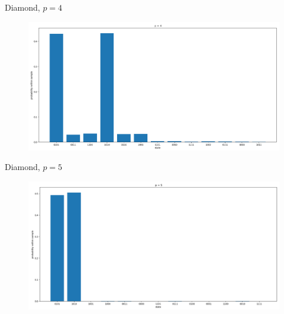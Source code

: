 \documentclass{beamer}
\begin{document}
\begin{frame}{Diamond, $p = 4$}
\begin{figure}
	\centering
	\includegraphics[scale=0.3,left]{figures/diamond-p4.png}
\end{figure}
\end{frame}

\begin{frame}{Diamond, $p = 5$}
\begin{figure}
	\centering
	\includegraphics[scale=0.3,left]{figures/diamond-p5.png}
\end{figure}
\end{frame}
\end{document}
